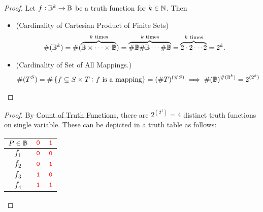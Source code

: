 \begin{proof}
	Let $f:\mathbb{B}^k\to\mathbb{B}$ be a truth function for $k\in\mathbb{N}$. Then
	\begin{itemize}
		\item[] (Cardinality of Cartesian Product of Finite Sets)
		\begin{align*}
			\#(\mathbb{B}^k)&=\#(\overbrace{\mathbb{B}\times\cdots\times\mathbb{B}}^{\text{$k$ times}})
			=\overbrace{\#\mathbb{B}\#\mathbb{B}\cdots\#\mathbb{B}}^{\text{$k$ times}}
			=\overbrace{2\cdot 2\cdots2}^{\text{$k$ times}}
			=2^k.
		\end{align*}
		\item[] (Cardinality of Set of All Mappings.)
		\begin{align*}
			\#(T^S)=\#\set{f\subseteq S\times T:\text{$f$ is a mapping}}=(\# T)^{(\# S)}
			\implies \#(\mathbb{B})^{\#(\mathbb{B}^k)}=2^{(2^k)}
		\end{align*}
	\end{itemize}
\end{proof}

\begin{proof}
	By \hyperlink{prop-A11}{Count of Truth Functions}, there are $2^{(2^1)}=4$
	distinct truth functions on single variable. These can be depicted in a truth table as follows:
	\begin{table}[h!]\centering
		\begin{tabular}{|c|cc|}
			\hline
			$P\in\mathbb{B}$ & $\textcolor{red}{\texttt 0}$ & $\textcolor{red}{\texttt 1}$ \\ \hline
			$f_1$ & $\textcolor{red}{\texttt 0}$ & $\textcolor{red}{\texttt 0}$ \\ \hline
			$f_2$ & $\textcolor{red}{\texttt 0}$ & $\textcolor{red}{\texttt 1}$ \\ \hline
			$f_3$ & $\textcolor{red}{\texttt 1}$ & $\textcolor{red}{\texttt 0}$ \\ \hline
			$f_4$ & $\textcolor{red}{\texttt 1}$ & $\textcolor{red}{\texttt 1}$ \\\hline
		\end{tabular}
	\end{table}
	
\end{proof}

